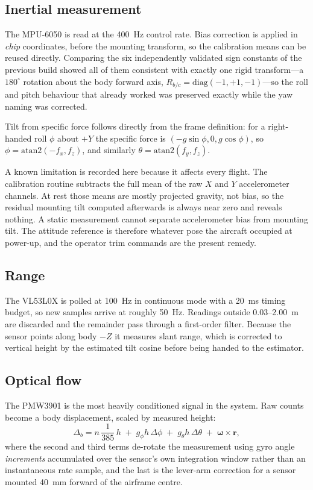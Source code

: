 \documentclass[conference]{IEEEtran}
\begin{document}
\subsection{Inertial measurement}

The MPU-6050 is read at the 400~Hz control rate. Bias correction is applied in
\emph{chip} coordinates, before the mounting transform, so the calibration
means can be reused directly. Comparing the six independently validated sign
constants of the previous build showed all of them consistent with exactly one
rigid transform---a $180^{\circ}$ rotation about the body forward axis,
$R_{b/c}=\mathrm{diag}(-1,+1,-1)$---so the roll and pitch behaviour that
already worked was preserved exactly while the yaw naming was corrected.

Tilt from specific force follows directly from the frame definition: for a
right-handed roll $\phi$ about $+Y$ the specific force is
$(-g\sin\phi, 0, g\cos\phi)$, so $\phi = \mathrm{atan2}(-f_x, f_z)$, and
similarly $\theta = \mathrm{atan2}(f_y, f_z)$.

A known limitation is recorded here because it affects every flight. The
calibration routine subtracts the full mean of the raw $X$ and $Y$
accelerometer channels. At rest those means are mostly projected gravity, not
bias, so the residual mounting tilt computed afterwards is always near zero
and reveals nothing. A static measurement cannot separate accelerometer bias
from mounting tilt. The attitude reference is therefore whatever pose the
aircraft occupied at power-up, and the operator trim commands are the present
remedy.

\subsection{Range}

The VL53L0X is polled at 100~Hz in continuous mode with a 20~ms timing budget,
so new samples arrive at roughly 50~Hz. Readings outside 0.03--2.00~m are
discarded and the remainder pass through a first-order filter. Because the
sensor points along body $-Z$ it measures slant range, which is corrected to
vertical height by the estimated tilt cosine before being handed to the
estimator.

\subsection{Optical flow}

The PMW3901 is the most heavily conditioned signal in the system. Raw counts
become a body displacement, scaled by measured height:
\begin{equation}
\Delta_{b} = n\,\frac{1}{385}\,h
 \;+\; g_{\phi} h\,\Delta\phi
 \;+\; g_{\theta} h\,\Delta\theta
 \;+\; \boldsymbol{\omega}\times\mathbf{r},
\label{eq:flow}
\end{equation}
where the second and third terms de-rotate the measurement using gyro angle
\emph{increments} accumulated over the sensor's own integration window rather
than an instantaneous rate sample, and the last is the lever-arm correction
for a sensor mounted 40~mm forward of the airframe centre.
\end{document}
